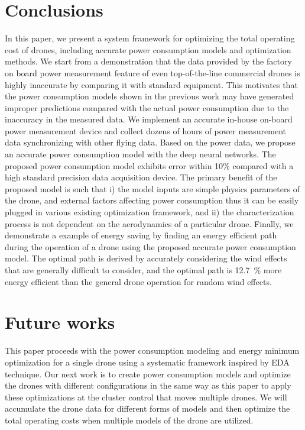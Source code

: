 \documentclass[journal]{./template/IEEEtran}
\begin{document}
\section{Conclusions}

In this paper, we present a system framework for optimizing the total operating cost of drones, including accurate power consumption models and optimization methods.
We start from a demonstration that the data provided by the factory on board power measurement feature of even top-of-the-line commercial drones is highly inaccurate by comparing it with standard equipment. 
This motivates that the power consumption models shown in the previous work may have generated improper predictions compared with the actual power consumption due to the inaccuracy in the measured data.
We implement an accurate in-house on-board power measurement device and collect dozens of hours of power measurement data synchronizing with other flying data. 
Based on the power data, we propose an accurate power consumption model with the deep neural networks. 
The proposed power consumption model exhibits error within 10\% compared with a high standard precision data acquisition device. 
The primary benefit of the proposed model is such that i) the model inputs are simple physics parameters of the drone, and external factors affecting power consumption thus it can be easily plugged in various existing optimization framework, and ii) the characterization process is not dependent on the aerodynamics of a particular drone. %
Finally, we demonstrate a example of energy saving by finding an energy efficient path during the operation of a drone using the proposed accurate power consumption model. The optimal path is derived by accurately considering the wind effects that are generally difficult to consider, and the optimal path is 12.7~\% more energy efficient than the general drone operation for random wind effects.








\section{Future works}
This paper proceeds with the power consumption modeling and energy minimum optimization for a single drone using a systematic framework inspired by EDA technique. Our next work is to create power consumption models and optimize the drones with different configurations in the same way as this paper to apply these optimizations at the cluster control that moves multiple drones. We will accumulate the drone data for different forms of models and then optimize the total operating costs when multiple models of the drone are utilized.
\end{document}
